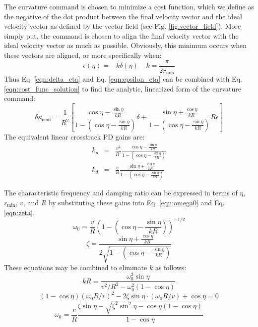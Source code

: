 \documentclass{article} %
\begin{document}
The curvature command is chosen to minimize a cost function, which we
define as the negative of the dot product between the final velocity
vector and the ideal velocity vector as defined by the vector field
(see Fig. \ref{fig:vector_field}).  More simply put, the command is
chosen to align the final velocity vector with the ideal velocity
vector as much as possible.  Obviously, this minimum occurs when these
vectors are aligned, or more specifically when:
%
\begin{equation}
\epsilon(\eta) = -k \delta(\eta)\;\;\;\; k = \frac{\pi}{2 r_{\mathrm{min}}}
\label{eqn:cost_func_solution}
\end{equation}
%
Thus Eq. \ref{eqn:delta_eta} and Eq. \ref{eqn:epsilon_eta} can be
combined with Eq. \ref{eqn:cost_func_solution} to find the analytic,
linearized form of the curvature command:
\begin{equation}
\delta \kappa_{\mathrm{cmd}} = \frac{1}{R^2} \left[
\frac{\cos \eta - \frac{\sin \eta}{kR}}
{1 - (\cos \eta - \frac{\sin \eta}{kR})} \delta +
\frac{\sin \eta + \frac{\cos \eta}{kR}}
{1 - (\cos \eta - \frac{\sin \eta}{kR})} R \epsilon
\right]
\end{equation}
The equivalent linear crosstrack PD gains are:
\begin{eqnarray}
k_p &=& \frac{v^2}{R^2}
\frac{\cos \eta - \frac{\sin \eta}{kR}}
{1 - (\cos \eta - \frac{\sin \eta}{kR})} \\
k_d &=& \frac{v}{R}
\frac{\sin \eta + \frac{\cos \eta}{kR}}
{1 - (\cos \eta - \frac{\sin \eta}{kR})}
\end{eqnarray}

The characteristic frequency and damping ratio can be expressed in
terms of $\eta$, $r_{\mathrm{min}}$, $v$, and $R$ by substituting
these gains into Eq. \ref{eqn:omega0} and Eq. \ref{eqn:zeta}.
\begin{equation}
\omega_0 = \frac{v}{R}
\left( 1 - (\cos \eta - \frac{\sin \eta}{kR}) \right)^{-1/2}
\label{eqn:path_omega0}
\end{equation}
%
\begin{equation}
\zeta = \frac{\sin \eta + \frac{\cos \eta}{kR}}
{2 \sqrt{1 - (\cos \eta - \frac{\sin \eta}{kR})}}
\label{eqn:path_zeta}
\end{equation}
%
These equations may be combined to eliminate $k$ as follows:
\begin{equation}
kR = \frac{\omega_0^2 \sin \eta}{v^2/R^2 - \omega_0^2 (1 - \cos \eta)}
\label{eqn:kr}
\end{equation}
%
\begin{equation}
(1 - \cos \eta) (\omega_0 R / v)^2 - 2 \zeta \sin \eta \cdot (\omega_0 R /v) +
\cos \eta = 0
\end{equation}
%
\begin{equation}
\omega_0 = \frac{v}{R} \frac{
\zeta \sin \eta - \sqrt{\zeta^2 \sin^2 \eta - \cos \eta (1 - \cos \eta)}
}{
1 - \cos \eta
}
\label{eqn:omega_zeta_eta}
\end{equation}
\end{document}
